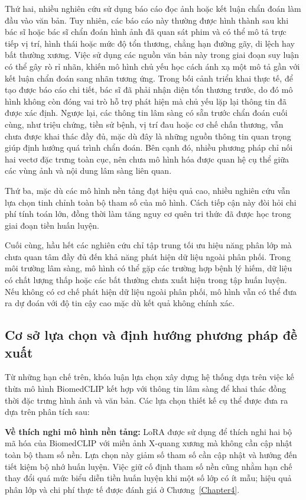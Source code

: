 Thứ hai, nhiều nghiên cứu sử dụng báo cáo đọc ảnh hoặc kết luận chẩn đoán làm đầu vào văn bản. Tuy nhiên, các báo cáo này thường được hình thành sau khi bác sĩ hoặc bác sĩ chẩn đoán hình ảnh đã quan sát phim và có thể mô tả trực tiếp vị trí, hình thái hoặc mức độ tổn thương, chẳng hạn đường gãy, di lệch hay bất thường xương. Việc sử dụng các nguồn văn bản này trong giai đoạn suy luận có thể gây rò rỉ nhãn, khiến mô hình chủ yếu học cách ánh xạ một mô tả gần với kết luận chẩn đoán sang nhãn tương ứng. Trong bối cảnh triển khai thực tế, để tạo được báo cáo chi tiết, bác sĩ đã phải nhận diện tổn thương trước, do đó mô hình không còn đóng vai trò hỗ trợ phát hiện mà chủ yếu lặp lại thông tin đã được xác định. Ngược lại, các thông tin lâm sàng có sẵn trước chẩn đoán cuối cùng, như triệu chứng, tiền sử bệnh, vị trí đau hoặc cơ chế chấn thương, vẫn chưa được khai thác đầy đủ, mặc dù đây là những nguồn thông tin quan trọng giúp định hướng quá trình chẩn đoán. Bên cạnh đó, nhiều phương pháp chỉ nối hai vectơ đặc trưng toàn cục, nên chưa mô hình hóa được quan hệ cụ thể giữa các vùng ảnh và nội dung lâm sàng liên quan.

Thứ ba, mặc dù các mô hình nền tảng đạt hiệu quả cao, nhiều nghiên cứu vẫn lựa chọn tinh chỉnh toàn bộ tham số của mô hình. Cách tiếp cận này đòi hỏi chi phí tính toán lớn, đồng thời làm tăng nguy cơ quên tri thức đã được học trong giai đoạn tiền huấn luyện.

Cuối cùng, hầu hết các nghiên cứu chỉ tập trung tối ưu hiệu năng phân lớp mà chưa quan tâm đầy đủ đến khả năng phát hiện dữ liệu ngoài phân phối. Trong môi trường lâm sàng, mô hình có thể gặp các trường hợp bệnh lý hiếm, dữ liệu có chất lượng thấp hoặc các bất thường chưa xuất hiện trong tập huấn luyện. Nếu không có cơ chế phát hiện dữ liệu ngoài phân phối, mô hình vẫn có thể đưa ra dự đoán với độ tin cậy cao mặc dù kết quả không chính xác.

\subsection{Cơ sở lựa chọn và định hướng phương pháp đề xuất}
\label{subsec:ch2_method_direction}

Từ những hạn chế trên, khóa luận lựa chọn xây dựng hệ thống dựa trên việc kế thừa mô hình BiomedCLIP \cite{BiomedCLIP} kết hợp với thông tin lâm sàng để khai thác đồng thời đặc trưng hình ảnh và văn bản. Các lựa chọn thiết kế cụ thể được đưa ra dựa trên phân tích sau:

\textbf{Về thích nghi mô hình nền tảng:}
LoRA \cite{Hu2022LoRA} được sử dụng để thích nghi hai bộ mã hóa của BiomedCLIP với miền ảnh X-quang xương mà không cần cập nhật toàn bộ tham số nền. Lựa chọn này giảm số tham số cần cập nhật và hướng đến tiết kiệm bộ nhớ huấn luyện. Việc giữ cố định tham số nền cũng nhằm hạn chế thay đổi quá mức biểu diễn tiền huấn luyện khi một số lớp có ít mẫu; hiệu quả phân lớp và chi phí thực tế được đánh giá ở Chương~\ref{Chapter4}.

